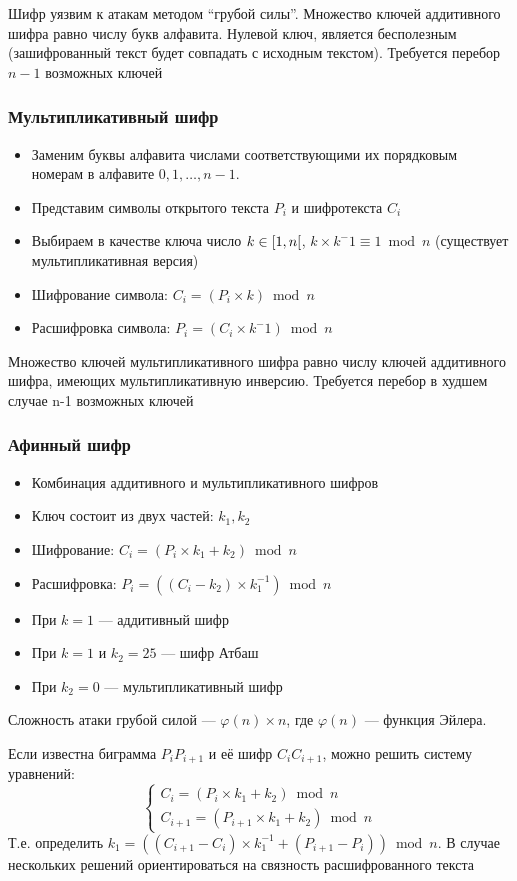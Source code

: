 \documentclass[a4paper, 14pt]{extarticle}
\begin{document}
Шифр уязвим к атакам методом ``грубой силы''. Множество ключей аддитивного шифра равно числу букв алфавита. Нулевой ключ, является бесполезным (зашифрованный текст будет совпадать с исходным текстом). Требуется перебор $n-1$ возможных ключей

\subsubsection{Мультипликативный шифр}
\begin{itemize}
    \item Заменим буквы алфавита числами соответствующими их порядковым номерам в алфавите $0, 1, \ldots, n-1$.
    \item Представим символы открытого текста $P_i$ и шифротекста $C_i$
    \item Выбираем в качестве ключа число $k \in \interval[open right]{1}{n} $, $k\times k^-1 \equiv 1 \bmod n$ (существует мультипликативная версия)
    \item Шифрование символа: $C_i = (P_i \times k) \bmod n$
    \item Расшифровка символа: $P_i = (C_i \times k^-1) \bmod n$
\end{itemize}

Множество ключей мультипликативного шифра равно числу ключей аддитивного шифра, имеющих мультипликативную инверсию. Требуется перебор в худшем случае n-1 возможных ключей

\subsubsection{Афинный шифр}
\begin{itemize}
    \item Комбинация аддитивного и мультипликативного шифров
    \item Ключ состоит из двух частей: $k_1, k_2$
    \item Шифрование: $C_i = (P_i \times k_1 + k_2) \bmod n$
    \item Расшифровка: $ P_i = ((C_i - k_2) \times k_1^{-1}) \bmod n $
    \item При $k=1$ --- аддитивный шифр
    \item При $k=1$ и $k_2 = 25$ --- шифр Атбаш
    \item При $k_2=0$ --- мультипликативный шифр
\end{itemize}
Сложность атаки грубой силой --- $\varphi(n)\times n$, где $\varphi(n)$ --- функция Эйлера.

Если известна биграмма $P_{i}P_{i+1}$ и её шифр $C_{i}C_{i+1}$, можно решить систему уравнений:
\begin{equation*}
    \begin{cases}
        C_i = (P_i \times k_1 + k_2) \bmod n\\
        C_{i+1} = (P_{i+1} \times k_1 + k_2) \bmod n
    \end{cases}
\end{equation*}
Т.е. определить $ k_1 = ((C_{i+1} - C_i) \times k_1^{-1} + (P_{i+1} - P_i)) \bmod n $. В случае нескольких решений ориентироваться на связность расшифрованного текста
\end{document}
